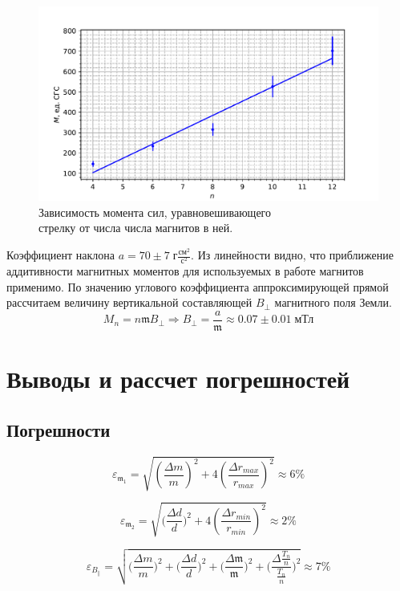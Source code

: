 \documentclass[a4paper,12pt]{article}
\begin{document}
\begin{figure}[h]
  \centering
  \includegraphics{moment.pdf}
  \caption{Зависимость момента сил, уравновешивающего \\ стрелку от числа числа магнитов в ней.}
\end{figure}

Коэффициент наклона $a = 70 \pm 7 \; \text{г}\frac{\text{см}^2}{\text{с}^2}.$ Из линейности видно, что приближение аддитивности магнитных моментов для используемых в работе магнитов применимо. По значению углового коэффициента аппроксимирующей прямой рассчитаем величину вертикальной составляющей $B_{\perp}$ магнитного поля Земли.
$$M_n = n\mathfrak{m}B_{\perp} \Rightarrow B_{\perp} = \frac{a}{\mathfrak{m}} \approx 0.07 \pm 0.01 \; \text{мТл}$$



\newpage
\section{Выводы и рассчет погрешностей}
\subsection{Погрешности}

\[ \varepsilon_{\mathfrak{m_1}} = \sqrt{\left(\frac{\Delta m}m\right)^2 + 4\left(\frac{\Delta r_{max}}{r_{max}}\right)^2} \approx 6 \%\]

\[ \varepsilon_{\mathfrak{m_2}} = \sqrt{\Big(\frac{\Delta d}d\Big)^2 + 4\left(\frac{\Delta r_{min}}{r_{min}}\right)^2}\approx 2 \%\]

\[\varepsilon_{B_{\|}} = \sqrt{\Big(\frac{\Delta m}m\Big)^2 + \Big(\frac{\Delta d}d\Big)^2 + \Big(\frac{\Delta \mathfrak{m}}{\mathfrak{m}}\Big)^2 + \Big(\frac{\Delta \frac{T_n}{n}}{\frac{T_n}{n}}\Big)^2} \approx 7 \% \]
\end{document}
